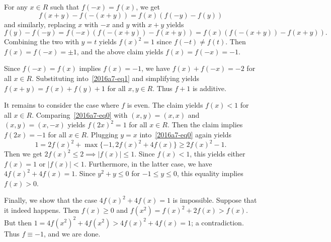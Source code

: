 For any $x \in R$ such that $f(-x) = f(x)$, we get
\[ f(x + y) - f(-(x + y)) = f(x) (f(-y) - f(y)) \]
    and similarly, replacing $x$ with $-x$ and $y$ with $x + y$ yields
\[ f(y) - f(-y) = f(-x) (f(-(x + y)) - f(x + y)) = f(x) (f(-(x + y)) - f(x + y)). \]
Combining the two with $y = t$ yields $f(x)^2 = 1$ since $f(-t) \neq f(t)$.
Then $f(x) = f(-x) = \pm 1$, and the above claim yields $f(x) = f(-x) = -1$.

Since $f(-x) = f(x)$ implies $f(x) = -1$, we have $f(x) + f(-x) = -2$ for all $x \in R$.
Substituting into~\eqref{2016a7-eq1} and simplifying yields $f(x + y) = f(x) + f(y) + 1$ for all $x, y \in R$.
Thus $f + 1$ is additive.

It remains to consider the case where $f$ is even.
The claim yields $f(x) < 1$ for all $x \in R$.
Comparing~\eqref{2016a7-eq0} with $(x, y) = (x, x)$ and $(x, y) = (x, -x)$ yields $f(2x)^2 = 1$ for all $x \in R$.
Then the claim implies $f(2x) = -1$ for all $x \in R$.
Plugging $y = x$ into~\eqref{2016a7-eq0} again yields
\[ 1 = 2 f(x)^2 + \max\{-1, 2 f(x)^2 + 4 f(x)\} \geq 2 f(x)^2 - 1. \]
Then we get $2 f(x)^2 \leq 2 \implies |f(x)| \leq 1$.
Since $f(x) < 1$, this yields either $f(x) = 1$ or $|f(x)| < 1$.
Furthermore, in the latter case, we have $4 f(x)^2 + 4 f(x) = 1$.
Since $y^2 + y \leq 0$ for $-1 \leq y \leq 0$, this equality implies $f(x) > 0$.

Finally, we show that the case $4 f(x)^2 + 4 f(x) = 1$ is impossible.
Suppose that it indeed happens.
Then $f(x) \geq 0$ and $f(x^2) = f(x)^2 + 2 f(x) > f(x)$.
But then $1 = 4 f(x^2)^2 + 4 f(x^2) > 4 f(x)^2 + 4 f(x) = 1$; a contradiction.
Thus $f \equiv -1$, and we are done.
